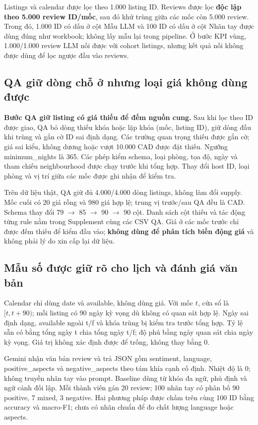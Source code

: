 \documentclass[11pt,a4paper]{article}
\begin{document}
Listings và calendar được lọc theo 1.000 listing ID. Reviews được lọc \textbf{độc lập theo 5.000 review ID/mốc}, sau đó khử trùng giữa các mốc còn 5.000 review. Trong đó, 1.000 ID có dấu ở cột Mẫu LLM và 100 ID có dấu ở cột Nhãn tay được dùng đúng như workbook; không lấy mẫu lại trong pipeline. Ở bước KPI vùng, 1.000/1.000 review LLM nối được với cohort listings, nhưng kết quả nối không được dùng để lọc ngược đầu vào reviews.

\subsection{QA giữ dòng chỗ ở nhưng loại giá không dùng được}
\textbf{Bước QA giữ listing có giá thiếu để đếm nguồn cung.} Sau khi lọc theo ID được giao, QA bỏ dòng thiếu khóa hoặc lặp khóa (mốc, listing ID), giữ dòng đầu khi trùng và gắn cờ ID sai định dạng. Các trường quan trọng thiếu được gắn cờ; giá sai kiểu, không dương hoặc vượt 10.000 CAD được đặt thiếu. Ngưỡng minimum\_nights là 365. Các phép kiểm schema, loại phòng, tọa độ, ngày và tham chiếu neighbourhood được chạy trước khi tổng hợp. Thay đổi host ID, loại phòng và vị trí giữa các mốc được ghi nhận để kiểm tra.

Trên dữ liệu thật, QA giữ đủ 4.000/4.000 dòng listings, không làm đổi supply. Mốc cuối có 20 giá rỗng và 980 giá hợp lệ; trung vị trước/sau QA đều là \GlobalMedian{} CAD. Schema thay đổi 79 $\rightarrow$ 85 $\rightarrow$ 90 $\rightarrow$ 90 cột. Danh sách cột thiếu và tác động từng rule nằm trong Supplement cùng các CSV QA. Giá ở các mốc trước chỉ được đếm thiếu để kiểm đầu vào; \textbf{không dùng để phân tích biến động giá} và không phải lý do xin cấp lại dữ liệu.

\subsection{Mẫu số được giữ rõ cho lịch và đánh giá văn bản}
Calendar chỉ dùng date và available, không dùng giá. Với mốc $t$, cửa sổ là $[t,t+90)$; mỗi listing có 90 ngày kỳ vọng dù không có quan sát hợp lệ. Ngày sai định dạng, available ngoài t/f và khóa trùng bị kiểm tra trước tổng hợp. Tỷ lệ sẵn có bằng tổng ngày t chia tổng ngày t/f; độ phủ bằng ngày quan sát chia ngày kỳ vọng. Giá trị không xác định được để trống, không thay bằng 0.

Gemini  nhận văn bản review và trả JSON gồm sentiment, language, positive\_aspects và negative\_aspects theo tám khía cạnh cố định. Nhiệt độ là 0; không truyền nhãn tay vào prompt. Baseline dùng từ khóa đa ngữ, phủ định và ngữ cảnh đối lập. Mỗi thành viên gán 20 review; 100 nhãn tay có phân bố 90 positive, 7 mixed, 3 negative. Hai phương pháp được chấm trên cùng 100 ID bằng accuracy và macro-F1; chưa có nhãn chuẩn để đo chất lượng language hoặc aspects.
\end{document}
